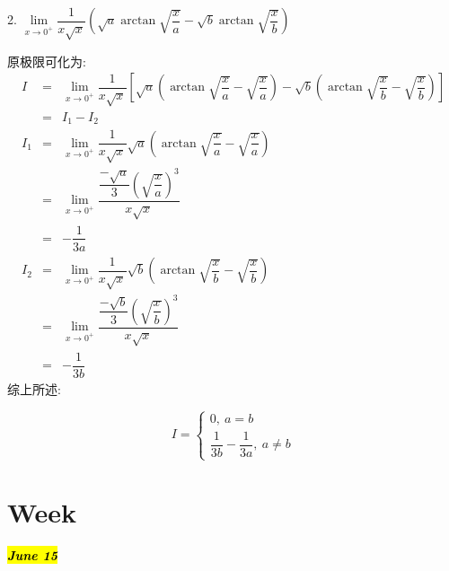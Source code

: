 2. $\lim\limits_{x\rightarrow 0^{+}}\dfrac{1}{x\sqrt{x}}(\sqrt{a}\arctan\sqrt{\dfrac{x}{a}}-\sqrt{b}\arctan\sqrt{\dfrac{x}{b}})$
\begin{solution}
	
	原极限可化为: 
	\begin{eqnarray*}
		I&=&\lim\limits_{x\rightarrow 0^{+}}\dfrac{1}{x\sqrt{x}}[\sqrt{a}(\arctan\sqrt{\dfrac{x}{a}}-\sqrt{\dfrac{x}{a}})-\sqrt{b}(\arctan\sqrt{\dfrac{x}{b}}-\sqrt{\dfrac{x}{b}})]\\
		&=&I_{1}-I_{2}\\
		I_{1}&=&\lim\limits_{x\rightarrow 0^{+}}\dfrac{1}{x\sqrt{x}}\sqrt{a}(\arctan\sqrt{\dfrac{x}{a}}-\sqrt{\dfrac{x}{a}})\\
		&=&\lim\limits_{x\rightarrow 0^{+}}\dfrac{\dfrac{-\sqrt{a}}{3}(\sqrt{\dfrac{x}{a}})^3}{x\sqrt{x}}\\
		&=&-\dfrac{1}{3a}\\
		I_{2}&=&\lim\limits_{x\rightarrow 0^{+}}\dfrac{1}{x\sqrt{x}}\sqrt{b}(\arctan\sqrt{\dfrac{x}{b}}-\sqrt{\dfrac{x}{b}})\\
		&=&\lim\limits_{x\rightarrow 0^{+}}\dfrac{\dfrac{-\sqrt{b}}{3}(\sqrt{\dfrac{x}{b}})^3}{x\sqrt{x}}\\
		&=&-\dfrac{1}{3b}
	\end{eqnarray*}
	综上所述: 
	
	$$I=\left\lbrace 
	\begin{array}{l}
		0,\ a=b\\
		\dfrac{1}{3b}-\dfrac{1}{3a},\ a\neq b
	\end{array}
	\right. $$
\end{solution}

\section{Week }
\hl{\textbf{\textit{June 15}}}

